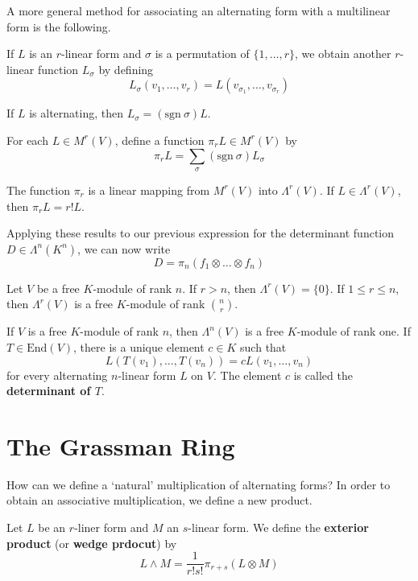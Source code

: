 A more general method for associating an alternating form with a multilinear form is the following.

\begin{remark}
	If $L$ is an $r$-linear form and $\sigma$ is a permutation of $\{ 1, \ldots, r \}$, we obtain another $r$-linear function $L_\sigma$ by defining
	\[
		L_\sigma(v_1, \ldots, v_r) = L(v_{\sigma_1}, \ldots, v_{\sigma_r})
	\]
	
	If $L$ is alternating, then $L_\sigma = (\text{sgn}~\sigma) L$.
	
	For each $L \in M^r(V)$, define a function $\pi_r L \in M^r(V)$ by
	\[
		\pi_r L = \sum_\sigma (\text{sgn}~\sigma) L_\sigma
	\]
\end{remark}

\begin{lemma}
	The function $\pi_r$ is a linear mapping from $M^r(V)$ into $\Lambda^r(V)$. If $L \in \Lambda^r(V)$, then $\pi_r L = r! L$.
\end{lemma}

Applying these results to our previous expression for the determinant function $D \in \Lambda^n(K^n)$, we can now write
\[
	D = \pi_n (f_1 \otimes \ldots \otimes f_n)
\]

\begin{theorem}
	Let $V$ be a free $K$-module of rank $n$. If $r > n$, then $\Lambda^r(V) = \{ 0 \}$. If $1 \leq r \leq n$, then $\Lambda^r(V)$ is a free $K$-module of rank $\binom{n}{r}$.
\end{theorem}

\begin{corollary}
	If $V$ is a free $K$-module of rank $n$, then $\Lambda^n(V)$ is a free $K$-module of rank one. If $T \in \text{End}(V)$, there is a unique element $c \in K$ such that
	\[
		L(T(v_1), \ldots, T(v_n)) = cL(v_1, \ldots, v_n)
	\]
	for every alternating $n$-linear form $L$ on $V$. The element $c$ is called the \textbf{determinant of $T$}.
\end{corollary}

\section{The Grassman Ring}

How can we define a `natural' multiplication of alternating forms? In order to obtain an associative multiplication, we define a new product.

\begin{definition}
	Let $L$ be an $r$-liner form and $M$ an $s$-linear form. We define the \textbf{exterior product} (or \textbf{wedge prdocut}) by
	\[
		L \wedge M = \frac{1}{r! s!} \pi_{r+s} (L \otimes M)
	\]
\end{definition}

